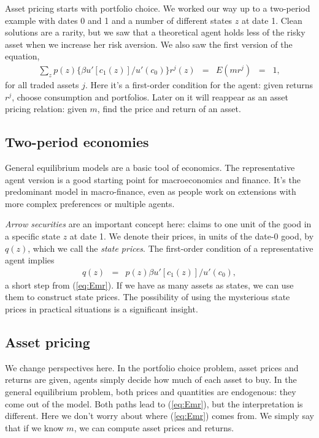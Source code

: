 \documentclass[11pt]{article}
\begin{document}
Asset pricing starts with portfolio choice.
We worked our way up to a two-period example
with dates 0 and 1 and a number of different states $z$ at date 1.
Clean solutions are a rarity, but we saw that a theoretical agent
holds less of the risky asset when we increase her risk aversion.
We also saw the first version of the equation,
\begin{eqnarray}
    \sum_z p(z) \{ \beta u'[c_1(z)]/u'(c_0) \} r^j(z) &=&
        E(m r^j) \;\;=\;\; 1,
        \label{eq:Emr}
\end{eqnarray}
for all traded assets $j$.
Here it's a first-order condition for the agent:
given returns $r^j$, choose consumption and portfolios.
Later on it will reappear as an asset pricing relation:
given $m$, find the price and return of an asset.


\subsection*{Two-period economies}

General equilibrium models are a basic tool of economics.
The representative agent version is a good starting point
for macroeconomics and finance.
It's the predominant model in macro-finance,
even as people work on extensions with more complex preferences
or multiple agents.

{\it Arrow securities\/} are an important concept here:
claims to one unit of the good in a specific state $z$ at date 1.
We denote their prices, in units of the date-0 good, by
$q(z)$, which we call the {\it state prices\/}.
The first-order condition of a representative agent implies
\begin{eqnarray}
    q(z) &=& p(z) \beta u'[c_1(z)]/u'(c_0) ,
\end{eqnarray}
a short step from (\ref{eq:Emr}).
If we have as many assets as states, we can
use them to construct state prices.
The possibility of using the mysterious
state prices in practical situations is a
significant insight.


\subsection*{Asset pricing}

We change perspectives here.
In the portfolio choice problem,
asset prices and returns are given,
agents simply decide how much of each asset to buy.
In the general equilibrium problem,
both prices and quantities are endogenous:
they come out of the model.
Both paths lead to (\ref{eq:Emr}), but the interpretation is different.
Here we don't worry about where (\ref{eq:Emr}) comes from.
We simply say that if we know $m$, we can compute asset prices and returns.
\end{document}
